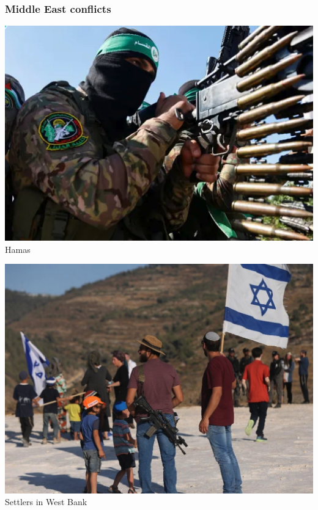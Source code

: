 \documentclass[aspectratio=43]{beamer}
\begin{document}
\begin{frame}
\frametitle{Middle East conflicts}
\centering

\begin{minipage}{0.49\textwidth}\centering
\includegraphics[width = .8\textwidth]{img/hamas}\\\footnotesize{Hamas}
\end{minipage}\hfill
\begin{minipage}{0.49\textwidth}\centering
\includegraphics[width = .7\textwidth]{img/settlers}\\\footnotesize{Settlers in West Bank} 
\end{minipage}

\vspace{10pt}


\end{frame}
\end{document}
